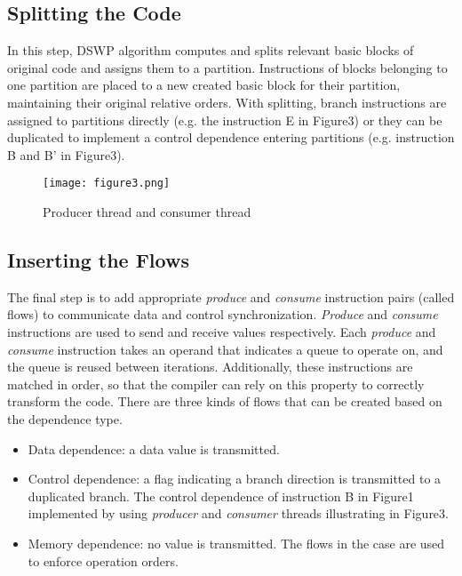 \documentclass[letterpaper, 10 pt, conference]{ieeeconf}  %
\begin{document}
\subsection{Splitting the Code}
In this step, DSWP algorithm computes and splits relevant basic blocks of original code and assigns them to a partition. Instructions of blocks belonging to one partition are placed to a new created basic block for their partition, maintaining their original relative orders. With splitting, branch instructions are assigned to partitions directly (e.g. the instruction E in Figure3) or they can be duplicated to implement a control dependence entering partitions (e.g. instruction B and B' in Figure3). 

\begin{figure}[h!]
\texttt{[image: figure3.png]}
	\centering
\caption{Producer thread and consumer thread}
  \centering
\end{figure}

\subsection{Inserting the Flows}
The final step is to add appropriate \textit{produce} and \textit{consume} instruction pairs (called flows) to communicate data and control synchronization. \textit{Produce} and \textit{consume} instructions are used to send and receive values respectively. Each \textit{produce} and \textit{consume} instruction takes an operand that indicates a queue to operate on, and the queue is reused between iterations. Additionally, these instructions are matched in order, so that the compiler can rely on this property to correctly transform the code. There are three kinds of flows that can be created based on the dependence type. 
\begin{itemize}
\item Data dependence: a data value is transmitted.
\end{itemize}
\begin{itemize}
\item Control dependence: a flag indicating a branch direction is transmitted to a duplicated branch. The control dependence of instruction B in Figure1 implemented by using \textit{producer} and \textit{consumer} threads illustrating in Figure3.
\end{itemize}
\begin{itemize}
\item Memory dependence: no value is transmitted. The flows in the case are used to enforce operation orders.
\end{itemize}
\end{document}

